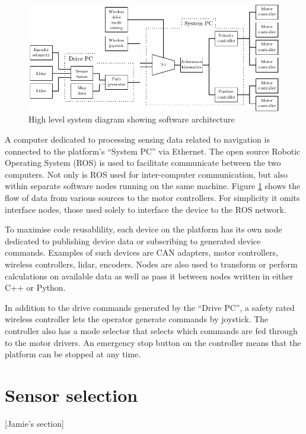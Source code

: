 \documentclass[preprint,authoryear,12pt]{elsarticle}
\begin{document}
    \begin{figure}[htb]
        \centering
        \includegraphics[width=\linewidth]{imgs/system_diagram/software.pdf}
        \caption{High level system diagram showing software architecture}
        \label{fig:system_diagram_software}
    \end{figure}

    A computer dedicated to processing sensing data related to navigation is connected to the platform's ``System PC'' via Ethernet.
    The open source Robotic Operating System (ROS) is used to facilitate communicate between the two computers.
    Not only is ROS used for inter-computer communication, but also within separate software nodes running on the same machine.
    Figure \ref{fig:system_diagram_software} shows the flow of data from various sources to the motor controllers.
    For simplicity it omits interface nodes, those used solely to interface the device to the ROS network.

    To maximise code reusablility, each device on the platform has its own node dedicated to publishing device data or subscribing to generated device commands.
    Examples of such devices are CAN adapters, motor controllers, wireless controllers, lidar, encoders.
    Nodes are also used to transform or perform calculations on available data as well as pass it between nodes written in either C++ or Python.

    In addition to the drive commands generated by the ``Drive PC'', a safety rated wireless controller lets the operator generate commands by joystick.
    The controller also has a mode selector that selects which commands are fed through to the motor drivers.
    An emergency stop button on the controller means that the platform can be stopped at any time.

\section{Sensor selection}
\label{sect:sensors}
    [Jamie's section]
\end{document}
